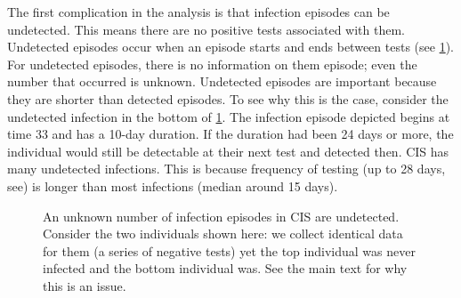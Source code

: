 \documentclass[thesis.tex]{subfiles}
\begin{document}
The first complication in the analysis is that infection episodes can be undetected.
This means there are no positive tests associated with them.
Undetected episodes occur when an episode starts and ends between tests (see \cref{perf-test:fig:truncation}).
For undetected episodes, there is no information on them episode; even the number that occurred is unknown.
Undetected episodes are important because they are shorter than detected episodes.
To see why this is the case, consider the undetected infection in the bottom of \cref{perf-test:fig:truncation}.
The infection episode depicted begins at time 33 and has a 10-day duration.
If the duration had been 24 days or more, the individual would still be detectable at their next test and detected then.
CIS has many undetected infections. This is because frequency of testing (up to 28 days, see) is longer than most infections (median around 15 days).
\begin{figure}
  \caption[Undetected episodes in CIS data]{An unknown number of infection episodes in CIS are undetected. Consider the two individuals shown here: we collect identical data for them (a series of negative tests) yet the top individual was never infected and the bottom individual was. See the main text for why this is an issue. \label{perf-test:fig:truncation}}
\end{figure}
\end{document}
